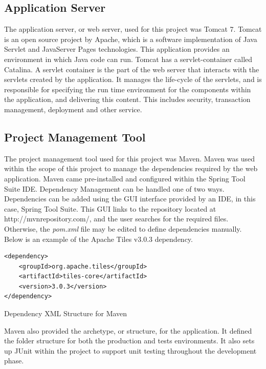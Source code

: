 \subsection{Application Server}

The application server, or web server, used for this project was Tomcat 7.  Tomcat is an open source project by Apache, which is a software implementation of Java Servlet and JavaServer Pages technologies. This application provides an environment in which Java code can run. Tomcat has a servlet-container called Catalina. A servlet container is the part of the web server that interacts with the servlets created by the application. It manages the life-cycle of the servlets, and is responsible for specifying the run time environment for the components within the application, and delivering this content. This includes security, transaction management, deployment and other service. 

\subsection{Project Management Tool}

The project management tool used for this project was Maven. Maven was used within the scope of this project to manage the dependencies required by the web application. Maven came pre-installed and configured within the Spring Tool Suite IDE. Dependency Management can be handled one of two ways. Dependencies can be added using the GUI interface provided by an IDE, in this case, Spring Tool Suite. This GUI links to the repository located at http://mvnrepository.com/, and the user searches for the required files. Otherwise, the \textit{pom.xml} file may be edited to define dependencies manually. Below is an example of the Apache Tiles v3.0.3 dependency.

\begin{table}[H]
\begin{lstlisting}
<dependency>
	<groupId>org.apache.tiles</groupId>
	<artifactId>tiles-core</artifactId>
	<version>3.0.3</version>
</dependency>
\end{lstlisting}
\caption{Dependency XML Structure for Maven}
\end{table}

Maven also provided the archetype, or structure, for the application. It defined the folder structure for both the production and tests environments. It also sets up JUnit within the project to support unit testing throughout the development phase.

